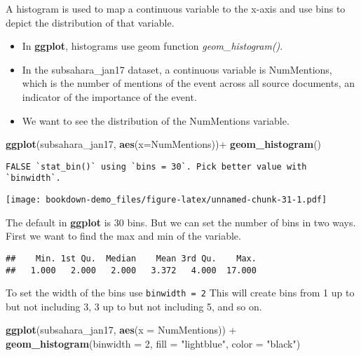 \documentclass[]{book}
\newenvironment{Shaded}{\begin{snugshade}}{\end{snugshade}}
\newcommand{\KeywordTok}[1]{\textcolor[rgb]{0.13,0.29,0.53}{\textbf{{#1}}}}
\newcommand{\DataTypeTok}[1]{\textcolor[rgb]{0.13,0.29,0.53}{{#1}}}
\newcommand{\DecValTok}[1]{\textcolor[rgb]{0.00,0.00,0.81}{{#1}}}
\newcommand{\StringTok}[1]{\textcolor[rgb]{0.31,0.60,0.02}{{#1}}}
\newcommand{\NormalTok}[1]{{#1}}
\theoremstyle{definition}
\theoremstyle{definition}
\theoremstyle{remark}
\begin{document}
A histogram is used to map a continuous variable to the x-axis and use
bins to depict the distribution of that variable.

\begin{itemize}
\item
  In \textbf{ggplot}, histograms use geom function
  \emph{geom\_histogram()}.
\item
  In the subsahara\_jan17 dataset, a continuous variable is NumMentions,
  which is the number of mentions of the event across all source
  documents, an indicator of the importance of the event.
\item
  We want to see the distribution of the NumMentions variable.
\end{itemize}

\begin{Shaded}
\begin{Highlighting}[]
\KeywordTok{ggplot}\NormalTok{(subsahara_jan17, }\KeywordTok{aes}\NormalTok{(}\DataTypeTok{x=}\NormalTok{NumMentions))+}
\StringTok{  }\KeywordTok{geom_histogram}\NormalTok{()}
\end{Highlighting}
\end{Shaded}

\begin{verbatim}
FALSE `stat_bin()` using `bins = 30`. Pick better value with `binwidth`.
\end{verbatim}

\texttt{[image: bookdown-demo\_files/figure-latex/unnamed-chunk-31-1.pdf]}

The default in \textbf{ggplot} is 30 bins. But we can set the number of
bins in two ways. First we want to find the max and min of the variable.

\begin{Shaded}
\end{Shaded}

\begin{verbatim}
##    Min. 1st Qu.  Median    Mean 3rd Qu.    Max. 
##   1.000   2.000   2.000   3.372   4.000  17.000
\end{verbatim}

To set the width of the bins use \texttt{binwidth\ =\ 2} This will
create bins from 1 up to but not including 3, 3 up to but not including
5, and so on.

\begin{Shaded}
\begin{Highlighting}[]
\KeywordTok{ggplot}\NormalTok{(subsahara_jan17, }\KeywordTok{aes}\NormalTok{(}\DataTypeTok{x =} \NormalTok{NumMentions)) +}
\StringTok{  }\KeywordTok{geom_histogram}\NormalTok{(}\DataTypeTok{binwidth =} \DecValTok{2}\NormalTok{, }\DataTypeTok{fill =} \StringTok{"lightblue"}\NormalTok{, }\DataTypeTok{color =} \StringTok{"black"}\NormalTok{)}
\end{Highlighting}
\end{Shaded}
\end{document}
